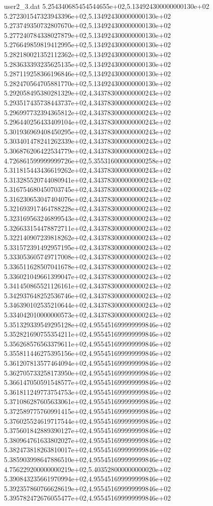 \begin{filecontents}{user2_3.dat}
5.254340685454544655e+02,5.134924300000000130e+02
5.272301547323943396e+02,5.134924300000000130e+02
5.273749350732807670e+02,5.134924300000000130e+02
5.277240784338027879e+02,5.134924300000000130e+02
5.276649859819412995e+02,5.134924300000000130e+02
5.282180021352112362e+02,5.134924300000000130e+02
5.283633393235625135e+02,5.134924300000000130e+02
5.287119258366196846e+02,5.134924300000000130e+02
5.282470564705881770e+02,5.134924300000000130e+02
5.292058495380281329e+02,4.343783000000000243e+02
5.293517435738443737e+02,4.343783000000000243e+02
5.296997732394365812e+02,4.343783000000000243e+02
5.296440256433409104e+02,4.343783000000000243e+02
5.301936969408450295e+02,4.343783000000000243e+02
5.303401478241262339e+02,4.343783000000000243e+02
5.306876206422534779e+02,4.343783000000000243e+02
4.726861599999999726e+02,5.355316000000000258e+02
5.311815443436619262e+02,4.343783000000000243e+02
5.313285520744080941e+02,4.343783000000000243e+02
5.316754680450703745e+02,4.343783000000000243e+02
5.316230653047404076e+02,4.343783000000000243e+02
5.321693917464788228e+02,4.343783000000000243e+02
5.323169563246899543e+02,4.343783000000000243e+02
5.326633154478872711e+02,4.343783000000000243e+02
5.322140907239818262e+02,4.343783000000000243e+02
5.331572391492957195e+02,4.343783000000000243e+02
5.333053605749717008e+02,4.343783000000000243e+02
5.336511628507041678e+02,4.343783000000000243e+02
5.336021049661399047e+02,4.343783000000000243e+02
5.341450865521126161e+02,4.343783000000000243e+02
5.342937648252536746e+02,4.343783000000000243e+02
5.346390102535210644e+02,4.343783000000000243e+02
5.334042010000000573e+02,4.343783000000000243e+02
5.351329339549295128e+02,4.955451699999999846e+02
5.352821690755354211e+02,4.955451699999999846e+02
5.356268576563379611e+02,4.955451699999999846e+02
5.355811446275395156e+02,4.955451699999999846e+02
5.361207813577464094e+02,4.955451699999999846e+02
5.362705733258173950e+02,4.955451699999999846e+02
5.366147050591548577e+02,4.955451699999999846e+02
5.361811249773754753e+02,4.955451699999999846e+02
5.371086287605633061e+02,4.955451699999999846e+02
5.372589775760991415e+02,4.955451699999999846e+02
5.376025524619717544e+02,4.955451699999999846e+02
5.375601842889390127e+02,4.955451699999999846e+02
5.380964761633802027e+02,4.955451699999999846e+02
5.382473818263810017e+02,4.955451699999999846e+02
5.385903998647886510e+02,4.955451699999999846e+02
4.756229200000000219e+02,5.403528000000000020e+02
5.390843235661970994e+02,4.955451699999999846e+02
5.392357860766628619e+02,4.955451699999999846e+02
5.395782472676055477e+02,4.955451699999999846e+02

\end{filecontents}
